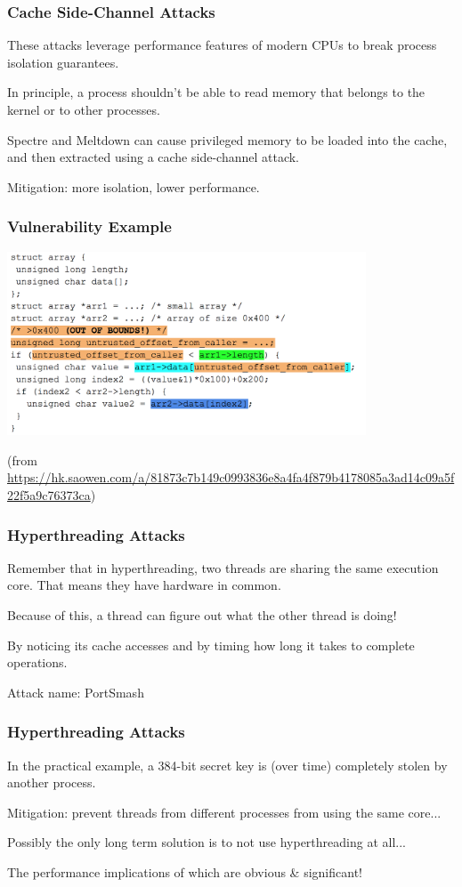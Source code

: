 \begin{frame}
\frametitle{Cache Side-Channel Attacks}

These attacks leverage performance features of modern CPUs to break process isolation guarantees.

In principle, a process shouldn't be able to read memory that belongs to the kernel or to other processes.

Spectre and Meltdown can cause privileged memory to be loaded into the cache, and then extracted using a cache side-channel attack.

Mitigation: more isolation, lower performance.

\end{frame}



\begin{frame}
\frametitle{Vulnerability Example}

\begin{center}
\includegraphics[width=0.8\textwidth]{images/cache-sidechannel1.png}
\end{center}
\tiny (from \url{https://hk.saowen.com/a/81873c7b149c0993836e8a4fa4f879b4178085a3ad14c09a5f22f5a9c76373ca})

\end{frame}

\begin{frame}
\frametitle{Hyperthreading Attacks}
Remember that in hyperthreading, two threads are sharing the same execution core. That means they have hardware in common. 

Because of this, a thread can figure out what the other thread is doing!

By noticing its cache accesses and by timing how long it takes to complete operations.

Attack name: PortSmash

\end{frame}

\begin{frame}
\frametitle{Hyperthreading Attacks}
In the practical example, a 384-bit secret key is (over time) completely stolen by another process. 

Mitigation: prevent threads from different processes from using the same core... 

Possibly the only long term solution is to not use hyperthreading at all... 

The performance implications of which are obvious \& significant!


\end{frame}


